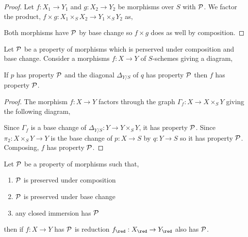 \documentclass[12pt]{article}
\begin{document}
\begin{proof}
Let $f : X_1 \to Y_1$ and $g : X_2 \to Y_2$ be morphisms over $S$ with $\mathcal{P}$. We factor the product, 
$f \times g : X_1 \times_S X_2 \to Y_1 \times_S Y_2$ as,
\begin{center}
\end{center}
Both morphisms have $\mathcal{P}$ by base change so $f \times g$ does as well by composition. 
\end{proof}

\begin{prop}
Let $\mathcal{P}$ be a property of morphisms which is perserved under composition and base change. Consider a morphisms $f : X \to Y$ of $S$-schemes giving a diagram,
\begin{center}
\end{center}
If $p$ has property $\mathcal{P}$ and the diagonal $\Delta_{Y/S}$ of $q$ has property $\mathcal{P}$ then $f$ has property $\mathcal{P}$.
\end{prop}

\begin{proof}
The morphism $f : X \to Y$ factors through the graph $\Gamma_f : X \to X \times_S Y$ giving the following diagram,
\begin{center}
\end{center}
Since $\Gamma_f$ is a base change of $\Delta_{Y/S} : Y \to Y \times_S Y$, it has property $\mathcal{P}$. Since $\pi_2 : X \times_S Y \to Y$ is the base change of $p : X \to S$ by $q : Y \to S$ so it has property $\mathcal{P}$. Composing, $f$ has property $\mathcal{P}$.
\end{proof}

\begin{prop}
Let $\mathcal{P}$ be a property of morphisms such that,
\begin{enumerate}
\item $\mathcal{P}$ is preserved under composition
\item $\mathcal{P}$ is preserved under base change
\item any closed immersion has $\mathcal{P}$
\end{enumerate} 
then if $f : X \to Y$ has $\mathcal{P}$ is reduction $f_{\red} : X_{\red} \to Y_{\red}$ also has $\mathcal{P}$.
\end{prop}
\end{document}
